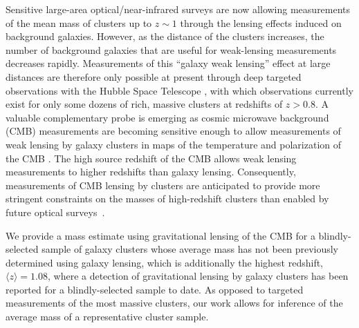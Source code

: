 \documentclass[preprint2]{aastex63}
\newcommand{\meanz}{1.08}
\begin{document}
Sensitive large-area optical/near-infrared surveys are now allowing measurements of the mean mass of clusters up to $z\sim1$ \citep{chiu19,murata19} through the lensing effects induced on background galaxies. However, as the distance of the clusters increases, the number of background galaxies that are useful for weak-lensing measurements decreases rapidly. Measurements of this ``galaxy weak lensing'' effect at large distances are therefore only possible at present through deep targeted observations  with the Hubble Space Telescope \citep{jee11,schrabback18}, with which observations currently exist for only some dozens of rich, 
massive clusters at redshifts of $z>0.8$.
A valuable complementary probe is emerging as cosmic microwave background (CMB) measurements are becoming sensitive enough to allow measurements of weak lensing by galaxy clusters in maps of the temperature and polarization of the CMB \cite[e.g.,][]{Mat2015,Baxter2015,PlnkSZCos2015,GP2017,2019ApJ...872..170R,2019MNRAS.489..401Z}. The high source redshift of the CMB allows weak lensing measurements to higher redshifts than galaxy lensing. Consequently, measurements of CMB lensing by clusters are anticipated to provide more stringent constraints on the masses of high-redshift clusters than enabled by future optical surveys~\citep[e.g.][]{madhavacheril17}.

We provide a mass estimate using gravitational lensing of the CMB for a blindly-selected sample of galaxy clusters whose average mass has not been previously determined using galaxy lensing, which is additionally the highest redshift, $\langle z\rangle=\meanz$, where a detection of gravitational lensing by galaxy clusters has been reported for a blindly-selected sample to date. As opposed to targeted measurements of the most massive clusters, our work allows for inference of the average mass of a representative cluster sample.
\end{document}
